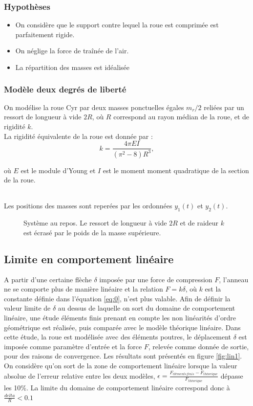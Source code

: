 \subsubsection{Hypothèses}
\begin{itemize}
    \item On considère que le support contre lequel la roue est comprimée est parfaitement rigide.
    \item On néglige la force de traînée de l'air.
    \item La répartition des masses est idéalisée
\end{itemize}

\subsubsection{Modèle deux degrés de liberté}
On modélise la roue Cyr par deux masses ponctuelles égales $m_r/2$ reliées par un ressort de longueur à vide $2R$, où $R$ correspond au rayon médian de la roue, et de rigidité $k$. \\
La rigidité équivalente de la roue est donnée par \cite{yangkim}:
\begin{equation}
    k=\frac{4\pi EI}{(\pi^2 -8)R^3},
    \label{eq:0}
\end{equation}

où $E$ est le module d'Young et $I$ est le moment moment quadratique de la section de la roue.

\\
 Les positions des masses sont reperées par les ordonnées $y_1(t)$ et $y_2(t)$.

\begin{figure}[htb]
\centering


\caption{Système au repos. Le ressort de longueur à vide $2R$ et de raideur $k$ est écrasé par le poids de la masse supérieure.}
\label{fig:repos}
\end{figure}

\subsection{Limite en comportement linéaire}

A partir d'une certaine flèche $\delta$ imposée par une force de compression $F$, l'anneau ne se comporte plus de manière linéaire et la relation $F=k\delta$, où $k$ est la constante définie dans l'équation \ref{eq:0}, n'est plus valable. 
Afin de définir la valeur limite de $\delta$ au dessus de laquelle on sort du domaine de comportement linéaire, une étude éléments finis prenant en compte les non linéarités d'ordre géométrique est réalisée, puis comparée avec le modèle théorique linéaire. Dans cette étude, la roue est modélisée avec des éléments poutres, le déplacement $\delta$ est imposée comme paramètre d'entrée et la force $F$, relevée comme donnée de sortie, pour des raisons de convergence.
Les résultats sont présentés en figure \ref{fig:lin1}.
On considère qu'on sort de la zone de comportement linéaire lorsque la valeur absolue de l'erreur relative entre les deux modèles, $\epsilon=\frac{F_{éléments finis}-F_{théorique}}{F_{théorique}}$ dépasse les 10\%. La limite du domaine de comportement linéaire correspond donc à $\frac{delta}{R}<0.1$

